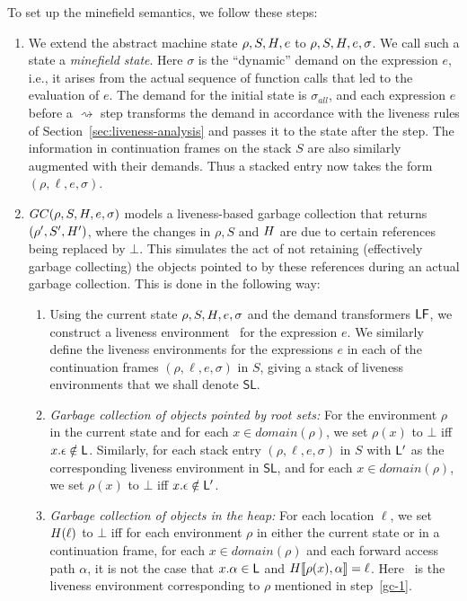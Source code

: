 \documentclass[9pt]{sigplanconf}
\newcommand{\stk}{{S}}
\begin{document}
\noindent To set up the minefield semantics, we follow these steps:
\begin{enumerate}

\item  We  extend  the  abstract  machine  state  $\rho,S,H,e$  to
  $\rho,S,H,e,\sigma$.   We call  such a  state a  \emph{minefield
  state}.  Here $\sigma$  is the ``dynamic'' demand  on the expression
  $e$, i.e., it arises from the actual sequence of function calls that
  led  to the  evaluation  of $e$. The demand for the initial state is  $\sigma_{all}$, and each expression $e$ before a $\rightsquigarrow$ step transforms the demand in accordance with the liveness rules of Section~\ref{sec:liveness-analysis} and passes it to the state after the step.  The  information in  continuation
  frames  on the  stack $S$  are also  similarly augmented  with their
  demands.  Thus a  stacked entry now takes the form  $(\rho, \ell, e,
  \sigma)$.
\item  $GC(\rho,  S,  H,  e, \sigma)$ models  a  liveness-based  garbage
  collection that returns $(\rho', S', H')$, where the changes in
  $\rho, S$ and  $H$ are due
  to certain references being replaced by $\bot$.  This simulates the
  act of  not retaining  (effectively garbage collecting)  the objects
  pointed to by these references  during an actual garbage collection.
  This is done in the following way:
  \begin{enumerate} 
  \item  \label{gc-1}Using the  current state  $\rho, \stk,  \heap, e,
    \sigma$  and the  demand  transformers $\mathsf{LF}$,  we construct  a
    liveness environment  \Lv\ for  the expression $e$.   We similarly
    define the liveness environments for the expressions $e$ in each of
    the  continuation frames $(\rho,  \ell, e,  \sigma)$ in
    $S$, giving a stack of  liveness environments that we shall denote
    $\mathsf{SL}$.
  \item \emph{Garbage collection of objects pointed by root sets:} For
    the environment $\rho$ in the current state and for each $x \in
    domain(\rho)$, we  set $\rho(x)$ to $\bot$  iff $x.\epsilon \notin
    \mathsf{L}$.  Similarly,  for each  stack entry $(\rho,\ell,e,\sigma)$
    in $S$ 
    with  $\mathsf{L}'$   as  the   corresponding  liveness   environment  in
    $\mathsf{SL}$, and for each $x \in domain(\rho)$, we set $\rho(x)$
    to $\bot$ iff $x.\epsilon \notin \mathsf{L}'$.
  \item \emph{Garbage  collection of  objects in  the heap:}  For each
    location $\ell$,  we set $H(\ell)$  to $\bot$ iff for each
    environment $\rho$ in either  the  current state or in a
    continuation frame, for each $x \in domain(\rho)$ and each forward
    access
    path $\alpha$, it is not the case that $x.\alpha \in \mathsf{L}$ and $H\llbracket\rho(x), \alpha
    \rrbracket = \ell$. Here 
\Lv\ is the liveness environment  corresponding to $\rho$ mentioned in
step~\ref{gc-1}.
  \end{enumerate}
\end{enumerate}
\end{document}
